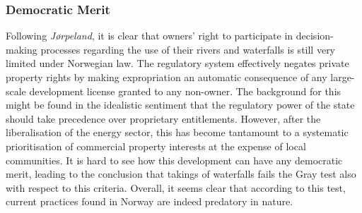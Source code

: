 \subsubsection{Democratic Merit}


Following \emph{Jørpeland}, it is clear that owners' right to participate in decision-making processes regarding the use of their rivers and waterfalls is still very limited under Norwegian law. The
regulatory system effectively negates private property rights by making expropriation an automatic consequence of any large-scale development license granted to any non-owner. The background for this might be found in the idealistic sentiment that the regulatory power of the state should take precedence over proprietary entitlements. However, after the liberalisation of the energy sector, this has become tantamount to a systematic prioritisation of commercial property interests at the expense of local communities. It is hard to see how this development can have any democratic merit, leading to the conclusion that takings of waterfalls fails the Gray test also with respect to this criteria. Overall, it seems clear that according to this test, current practices found in Norway are indeed predatory in nature.




